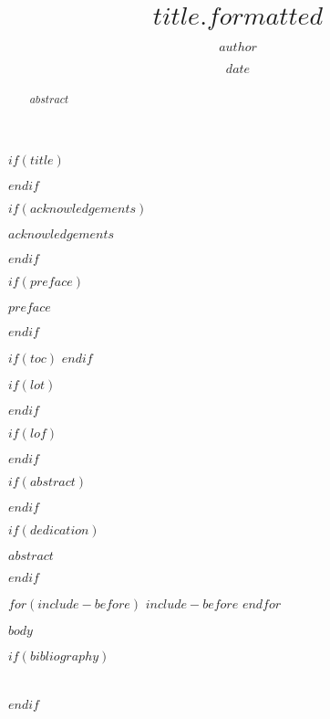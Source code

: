 \documentclass[12pt,twoside]{reedthesis}
\title{$title.formatted$}
\author{$author$}
\date{$date$}
\begin{document}
  $if(title)$
    \maketitle
  $endif$

  \frontmatter %
  \pagestyle{empty} %

  $if(acknowledgements)$
    \begin{acknowledgements}
      $acknowledgements$
    \end{acknowledgements}
  $endif$

  $if(preface)$
    \begin{preface}
      $preface$
    \end{preface}
  $endif$


  $if(toc)$
  {
    \hypersetup{linkcolor=$if(toccolor)$$toccolor$$else$black$endif$}
    \setcounter{tocdepth}{$toc-depth$}
    \tableofcontents
  }
  $endif$

  $if(lot)$
    \listoftables
  $endif$

  $if(lof)$
    \listoffigures
  $endif$

  $if(abstract)$
    \begin{abstract}
      $abstract$
    \end{abstract}
  $endif$

  $if(dedication)$
    \begin{dedication}
      $abstract$
    \end{dedication}
  $endif$

  $for(include-before)$
    $include-before$
  $endfor$

  \mainmatter %
  \pagestyle{fancyplain} %

  $body$

  \clearpage

  \backmatter

  $if(bibliography)$
    \chapter*{\bibname}
    
    
  $endif$
\end{document}
